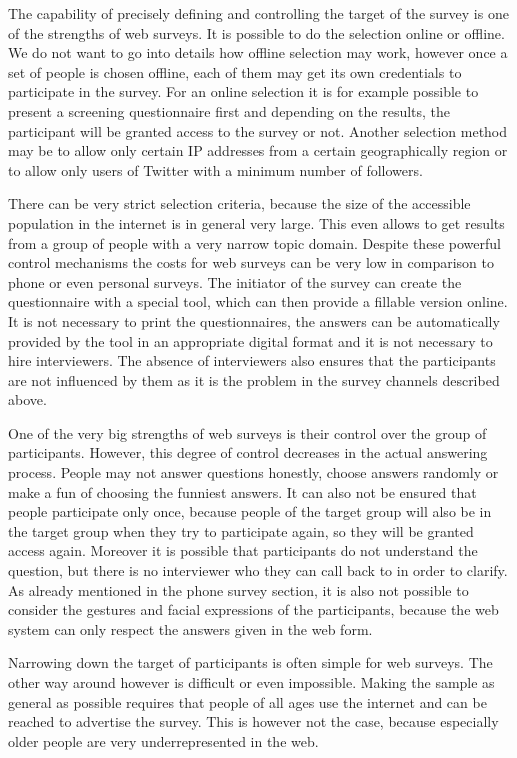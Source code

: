 \documentclass{report}
\begin{document}
The capability of precisely defining and controlling the target of the survey is one of the strengths of web surveys. It is possible to do the selection online or offline. We do not want to go into details how offline selection may work, however once a set of people is chosen offline, each of them may get its own credentials to participate in the survey. For an online selection it is for example possible to present a screening questionnaire first and depending on the results, the participant will be granted access to the survey or not. Another selection method may be to allow only certain IP addresses from a certain geographically region or to allow only users of Twitter with a minimum number of followers.

There can be very strict selection criteria, because the size of the accessible population in the internet is in general very large. This even allows to get results from a group of people with a very narrow topic domain. Despite these powerful control mechanisms the costs for web surveys can be very low in comparison to phone or even personal surveys. The initiator of the survey can create the questionnaire with a special tool, which can then provide a fillable version online. It is not necessary to print the questionnaires, the answers can be automatically provided by the tool in an appropriate digital format and it is not necessary to hire interviewers. The absence of interviewers also ensures that the participants are not influenced by them as it is the problem in the survey channels described above.

One of the very big strengths of web surveys is their control over the group of participants. However, this degree of control decreases in the actual answering process. People may not answer questions honestly, choose answers randomly or make a fun of choosing the funniest answers. It can also not be ensured that people participate only once, because people of the target group will also be in the target group when they try to participate again, so they will be granted access again. Moreover it is possible that participants do not understand the question, but there is no interviewer who they can call back to in order to clarify. As already mentioned in the phone survey section, it is also not possible to consider the gestures and facial expressions of the participants, because the web system can only respect the answers given in the web form.

Narrowing down the target of participants is often simple for web surveys. The other way around however is difficult or even impossible. Making the sample as general as possible requires that people of all ages use the internet and can be reached to advertise the survey. This is however not the case, because especially older people are very underrepresented in the web.
\end{document}
